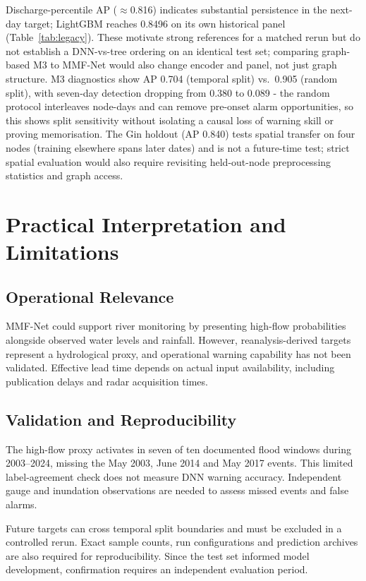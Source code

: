 \documentclass[conference]{IEEEtran}
\newcommand{\model}{MMF-Net}
\begin{document}
Discharge-percentile AP ($\approx$0.816) indicates substantial persistence
in the next-day target; LightGBM reaches 0.8496 on its own historical panel
(Table~\ref{tab:legacy}). These motivate strong references for a matched
rerun but do not establish a DNN-vs-tree ordering on an identical test set;
comparing graph-based M3 to \model{} would also change encoder and panel,
not just graph structure. M3 diagnostics show AP 0.704 (temporal split) vs.\
0.905 (random split), with seven-day detection dropping from 0.380 to 0.089
- the random protocol interleaves node-days and can remove pre-onset alarm
opportunities, so this shows split sensitivity without isolating a causal
loss of warning skill or proving memorisation. The Gin holdout (AP 0.840)
tests spatial transfer on four nodes (training elsewhere spans later dates)
and is not a future-time test; strict spatial evaluation would also require
revisiting held-out-node preprocessing statistics and graph access.

\section{Practical Interpretation and Limitations}

\subsection{Operational Relevance}
MMF-Net could support river monitoring by presenting
high-flow probabilities alongside observed water levels
and rainfall. However, reanalysis-derived targets represent
a hydrological proxy, and operational warning capability
has not been validated. Effective lead time depends on
actual input availability, including publication delays
and radar acquisition times.

\subsection{Validation and Reproducibility}
The high-flow proxy activates in seven of ten documented
flood windows during 2003--2024, missing the May 2003,
June 2014 and May 2017 events. This limited label-agreement
check does not measure DNN warning accuracy. Independent
gauge and inundation observations are needed to assess
missed events and false alarms.

Future targets can cross temporal split boundaries and
must be excluded in a controlled rerun. Exact sample
counts, run configurations and prediction archives are
also required for reproducibility. Since the test set
informed model development, confirmation requires an
independent evaluation period.
\end{document}
